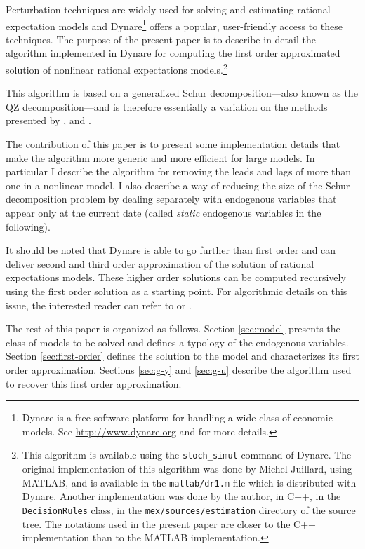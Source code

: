 \documentclass[11pt,a4paper]{article}
\begin{document}
Perturbation techniques are widely used for solving and estimating rational
expectation models and Dynare\footnote{Dynare is a free software platform for
  handling a wide class of economic models. See \url{http://www.dynare.org} and
  \citet{adjemian/al:2011} for more details.} offers a popular, user-friendly
access to these techniques. The purpose of the present paper is to describe in
detail the algorithm implemented in Dynare for computing the first order
approximated solution of nonlinear rational expectations models.\footnote{This
  algorithm is available using the \texttt{stoch\_simul} command of Dynare. The
  original implementation of this algorithm was done by Michel Juillard, using
  MATLAB, and is available in the \texttt{matlab/dr1.m} file which is
  distributed with Dynare. Another implementation was done by the author, in
  C++, in the \texttt{DecisionRules} class, in the
  \texttt{mex/sources/estimation} directory of the source tree. The notations
  used in the present paper are closer to the C++ implementation than to the
  MATLAB implementation.}

This algorithm is based on a generalized Schur decomposition---also known as
the QZ decomposition---and is therefore essentially a variation on the
methods presented by \citet{klein:2000}, \citet{sims:2001} and
\citet{uhlig:1999}.

The contribution of this paper is to present some implementation details that
make the algorithm more generic and more efficient for large models. In
particular I describe the algorithm for removing the leads and lags of more
than one in a nonlinear model. I also describe a way of reducing the size of
the Schur decomposition problem by dealing separately with endogenous variables
that appear only at the current date (called \emph{static} endogenous variables
in the following).

It should be noted that Dynare is able to go further than first order and can
deliver second and third order approximation of the solution of rational
expectations models. These higher order solutions can be computed recursively
using the first order solution as a starting point. For algorithmic details on
this issue, the interested reader can refer to
\citet{collard/juillard:2001:compecon} or \citet{schmitt-grohe/uribe:2004}.

The rest of this paper is organized as follows. Section \ref{sec:model}
presents the class of models to be solved and defines a typology of the
endogenous variables. Section \ref{sec:first-order} defines the solution
to the model and characterizes its first order approximation. Sections
\ref{sec:g-y} and \ref{sec:g-u} describe the algorithm used to recover this
first order approximation.
\end{document}
